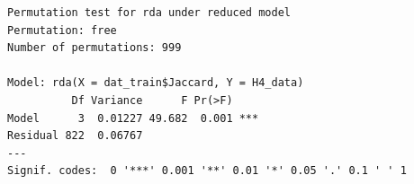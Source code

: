 \documentclass[
  letterpaper,
  DIV=11,
  numbers=noendperiod]{scrartcl}
\newenvironment{Shaded}{\begin{snugshade}}{\end{snugshade}}
\newcommand{\CommentTok}[1]{\textcolor[rgb]{0.37,0.37,0.37}{#1}}
\newcommand{\FunctionTok}[1]{\textcolor[rgb]{0.28,0.35,0.67}{#1}}
\newcommand{\NormalTok}[1]{\textcolor[rgb]{0.00,0.23,0.31}{#1}}
\newcommand{\SpecialCharTok}[1]{\textcolor[rgb]{0.37,0.37,0.37}{#1}}
\begin{document}
\begin{Shaded}
\end{Shaded}

\begin{verbatim}
Permutation test for rda under reduced model
Permutation: free
Number of permutations: 999

Model: rda(X = dat_train$Jaccard, Y = H4_data)
          Df Variance      F Pr(>F)    
Model      3  0.01227 49.682  0.001 ***
Residual 822  0.06767                  
---
Signif. codes:  0 '***' 0.001 '**' 0.01 '*' 0.05 '.' 0.1 ' ' 1
\end{verbatim}
\end{document}
